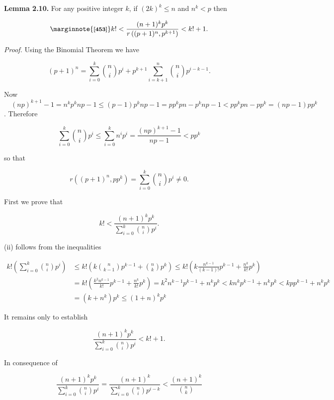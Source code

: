 \documentclass[10pt,letterpaper]{article}
\newcommand{\origpage}[1]{\marginnote{\footnotesize\textbf{[#1]}}}
\newcommand{\statement}[1]{\par\medskip\noindent\textbf{#1}\enspace}
\begin{document}
\statement{Lemma 2.10.} For any positive integer $k$, if $(2 k)^{k} \leq n$ and $n^{k}<p$ then

\[
\origpage{453}k!<\frac{(n+1)^{k} p^{k}}{r\left((p+1)^{n}, p^{k+1}\right)}<k!+1 .
\]

\textit{Proof.} Using the Binomial Theorem we have

\[
(p+1)^{n}=\sum_{i=0}^{k}\binom{n}{i} p^{i}+p^{k+1} \sum_{i=k+1}^{n}\binom{n}{i} p^{i-k-1} .
\]

Now $\quad(n p)^{k+1}-1=n^{k} p^{k} n p-1 \leq(p-1) p^{k} n p-1=p p^{k} p n-p^{k} n p-1<p p^{k} p n-p p^{k}=(n p-1) p p^{k}$. Therefore

\[
\sum_{i=0}^{k}\binom{n}{i} p^{i} \leq \sum_{i=0}^{k} n^{i} p^{i}=\frac{(n p)^{k+1}-1}{n p-1}<p p^{k}
\]

so that


\begin{equation*}
r\left((p+1)^{n}, p p^{k}\right)=\sum_{i=0}^{k}\binom{n}{i} p^{i} \neq 0 . \tag{i}
\end{equation*}


First we prove that


\begin{equation*}
k!<\frac{(n+1)^{k} p^{k}}{\sum_{i=0}^{k}\binom{n}{i} p^{i}} . \tag{ii}
\end{equation*}


(ii) follows from the inequalities

\[
\begin{aligned}
k!\left(\sum_{i=0}^{k}\binom{n}{i} p^{i}\right) & \leq k!\left(k\binom{n}{k-1} p^{k-1}+\binom{n}{k} p^{k}\right) \leq k!\left(k \frac{n^{k-1}}{(k-1)!} p^{k-1}+\frac{n^{k}}{k!} p^{k}\right) \\
& =k!\left(\frac{k^{2} n^{k-1}}{k!} p^{k-1}+\frac{n^{k}}{k!} p^{k}\right)=k^{2} n^{k-1} p^{k-1}+n^{k} p^{k}<k n^{k} p^{k-1}+n^{k} p^{k}<k p p^{k-1}+n^{k} p^{k} \\
& =\left(k+n^{k}\right) p^{k} \leq(1+n)^{k} p^{k}
\end{aligned}
\]

It remains only to establish


\begin{equation*}
\frac{(n+1)^{k} p^{k}}{\sum_{i=0}^{k}\binom{n}{i} p^{i}}<k!+1 . \tag{iii}
\end{equation*}


In consequence of

\[
\frac{(n+1)^{k} p^{k}}{\sum_{i=0}^{k}\binom{n}{i} p^{i}}=\frac{(n+1)^{k}}{\sum_{i=0}^{k}\binom{n}{i} p^{i-k}}<\frac{(n+1)^{k}}{\binom{n}{k}}
\]
\end{document}
